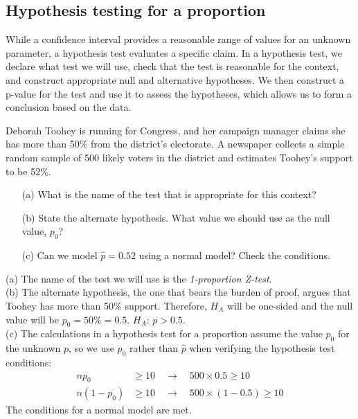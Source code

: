 \subsection{Hypothesis testing for a proportion}
\label{htForPropSection}

While a confidence interval provides a reasonable range of values for an unknown parameter, a hypothesis test evaluates a specific claim. In a hypothesis test, we declare what test we will use, check that the test is reasonable for the context, and construct appropriate null and alternative hypotheses. We then construct a p-value for the test and use it to assess the hypotheses, which allows us to form a conclusion based on the data.

\begin{example}{Deborah Toohey is running for Congress, and her campaign manager claims she has more than 50\% from the district's electorate. A newspaper collects a simple random sample of 500 likely voters in the district and estimates Toohey's support to be 52\%.
\begin{itemize}
\item[(a)] What is the name of the test that is appropriate for this context?
\item[(b)] State the alternate hypothesis. What value we should use as the null value, $p_{0}$?
\item[(c)] Can we model $\hat{p} = 0.52$ using a normal model? Check the conditions.
\end{itemize}}
\label{TooheyTestNameAndConditionExample}
(a) The name of the test we will use is the \emph{1-proportion Z-test}. \\[2mm]
(b) The alternate hypothesis, the one that bears the burden of proof, argues that Toohey has more than 50\% support. Therefore, $H_A$ will be one-sided and the null value will be $p_0 = 50\% = 0.5$. $H_A$: $p > 0.5$. \\[2mm]
(c) The calculations in a hypothesis test for a proportion assume the value $p_0$ for the unknown $p$, so we use $p_{0}$ rather than $\hat{p}$ when verifying the hypothesis test conditions:
\begin{align*}
np_0 &\geq 10 \quad \rightarrow \quad 500\times 0.5 \geq 10 \\
n(1-p_0) &\geq 10 \quad \rightarrow \quad 500 \times (1-0.5) \geq 10
\end{align*}
The conditions for a normal model are met.
\end{example}

\textA{\newpage}

